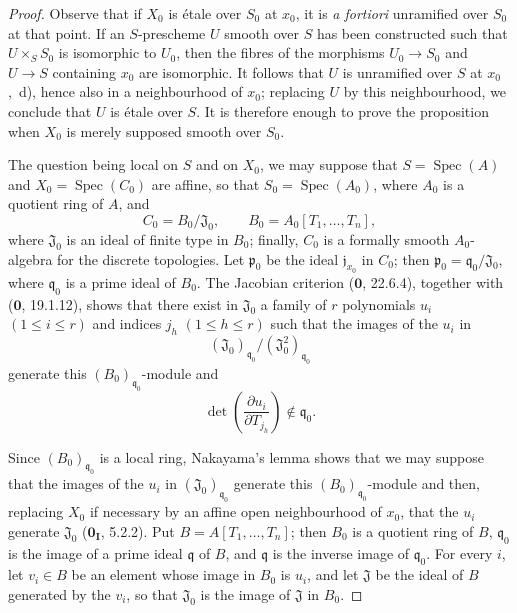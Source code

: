 \begin{proof}
Observe that if $X_0$ is \'etale over $S_0$ at $x_0$, it is \emph{a fortiori} unramified over $S_0$ at that point.  If an $S$-prescheme $U$ smooth over $S$ has been constructed such that $U\times_SS_0$ is isomorphic to $U_0$, then the fibres of the morphisms $U_0\to S_0$ and $U\to S$ containing $x_0$ are isomorphic.  It follows that $U$ is unramified over $S$ at $x_0$ ,~d), hence also in a neighbourhood of $x_0$; replacing $U$ by this neighbourhood, we conclude that $U$ is \'etale over $S$.  It is therefore enough to prove the proposition when $X_0$ is merely supposed smooth over $S_0$.

The question being local on $S$ and on $X_0$, we may suppose that $S=\operatorname{Spec}(A)$ and $X_0=\operatorname{Spec}(C_0)$ are affine, so that $S_0=\operatorname{Spec}(A_0)$, where $A_0$ is a quotient ring of $A$, and
\[
 C_0=B_0/\mathfrak{J}_0,\qquad B_0=A_0[T_1,\ldots,T_n],
\]
where $\mathfrak{J}_0$ is an ideal of finite type in $B_0$; finally, $C_0$ is a formally smooth $A_0$-algebra for the discrete topologies.  Let $\mathfrak p_0$ be the ideal $\mathfrak j_{x_0}$ in $C_0$; then $\mathfrak p_0=\mathfrak q_0/\mathfrak{J}_0$, where $\mathfrak q_0$ is a prime ideal of $B_0$.  The Jacobian criterion ($\mathbf{0}$, 22.6.4), together with ($\mathbf{0}$, 19.1.12), shows that there exist in $\mathfrak{J}_0$ a family of $r$ polynomials $u_i$ $(1\leq i\leq r)$ and indices $j_h$ $(1\leq h\leq r)$ such that the images of the $u_i$ in
\[
 (\mathfrak{J}_0)_{\mathfrak q_0}/(\mathfrak{J}_0^2)_{\mathfrak q_0}
\]
generate this $(B_0)_{\mathfrak q_0}$-module and
\begin{equation}
 \det\left(\frac{\partial u_i}{\partial T_{j_h}}\right)\notin\mathfrak q_0.
 \tag{18.1.1.1}\label{IV.18.1.1.1}
\end{equation}

Since $(B_0)_{\mathfrak q_0}$ is a local ring, Nakayama's lemma shows that we may suppose that the images of the $u_i$ in $(\mathfrak{J}_0)_{\mathfrak q_0}$ generate this $(B_0)_{\mathfrak q_0}$-module and then, replacing $X_0$ if necessary by an affine open neighbourhood of $x_0$, that the $u_i$ generate $\mathfrak{J}_0$ ($\mathbf{0}_{\mathbf I}$, 5.2.2).  Put $B=A[T_1,\ldots,T_n]$; then $B_0$ is a quotient ring
of $B$, $\mathfrak q_0$ is the image of a prime ideal $\mathfrak q$ of $B$, and $\mathfrak q$ is the inverse image of $\mathfrak q_0$.  For every $i$, let $v_i\in B$ be an element whose image in $B_0$ is $u_i$, and let $\mathfrak{J}$ be the ideal of $B$ generated by the $v_i$, so that $\mathfrak{J}_0$ is the image of $\mathfrak{J}$ in $B_0$.


\end{proof}
